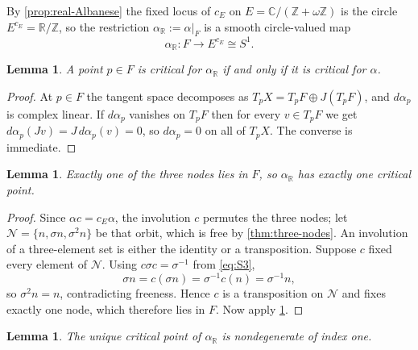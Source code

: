 \documentclass[11pt]{amsart}
\newtheorem{lemma}[theorem]{Lemma}
\theoremstyle{definition}
\theoremstyle{remark}
\newcommand{\Z}{\mathbb Z}
\newcommand{\R}{\mathbb R}
\newcommand{\C}{\mathbb C}
\newcommand{\omegaE}{\omega}
\begin{document}
By \cref{prop:real-Albanese} the fixed locus of $c_E$ on
$E=\C/(\Z+\omegaE\Z)$ is the circle $E^{c_E}=\R/\Z$, so
the restriction  $\alpha _{\R}:=\alpha |_F$ is a  smooth circle-valued map
\[
 \alpha_{\R}\colon F\longrightarrow E^{c_E}\cong S^1 .
\]

\begin{lemma}\label{lem:real-critical}
A point $p\in F$ is critical for $\alpha_\R$ if and only if it is critical
for $\alpha$.
\end{lemma}

\begin{proof}
At $p\in F$ the tangent space decomposes as $T_pX=T_pF\oplus J(T_pF)$, and
$d\alpha_p$ is complex linear.  If $d\alpha_p$ vanishes on $T_pF$ then for
every $v\in T_pF$ we get $d\alpha_p(Jv)=J\,d\alpha_p(v)=0$, so $d\alpha_p=0$
on all of $T_pX$.  The converse is immediate.
\end{proof}

\begin{lemma}\label{lem:one-real-node}
Exactly one of the three nodes lies in $F$, so $\alpha_\R$ has exactly one
critical point.
\end{lemma}

\begin{proof}
Since $\alpha c=c_E\alpha$, the involution $c$ permutes the three
nodes; let ${\mathcal {N}}=\{n,\sigma n,\sigma^2 n\}$ be that orbit,
which is free by \cref{thm:three-nodes}.  An involution of a
three-element set is either the identity or a transposition.  Suppose
$c$ fixed every element of ${\mathcal {N}}$.  Using $c\sigma
c=\sigma^{-1}$ from \eqref{eq:S3},
\[
 \sigma n=c(\sigma n)=\sigma^{-1}c(n)=\sigma^{-1}n,
\]
so $\sigma^2 n=n$, contradicting freeness.  Hence $c$ is a
transposition on ${\mathcal {N}}$ and fixes exactly one node, which
therefore lies in $F$.  Now apply \cref{lem:real-critical}.
\end{proof}

\begin{lemma}\label{lem:index-one}
The unique critical point of $\alpha_\R$ is nondegenerate of index one.
\end{lemma}
\end{document}
